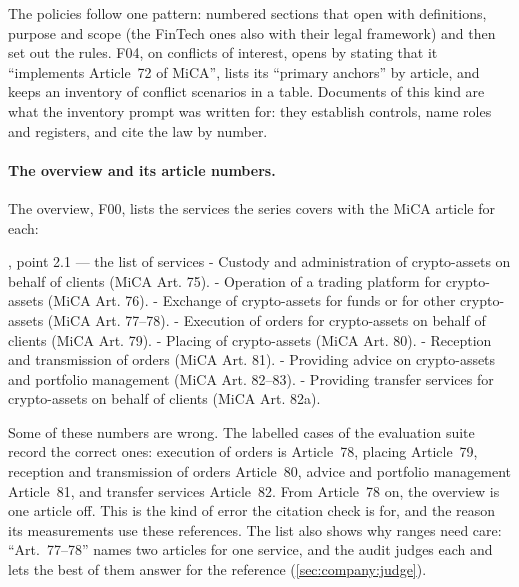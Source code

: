 The policies follow one pattern: numbered sections that open with definitions, purpose and
scope (the FinTech ones also with their legal framework) and then set out the rules. F04, on conflicts of interest, opens by stating that it
\enquote{implements Article~72 of MiCA}, lists its \enquote{primary anchors} by article, and
keeps an inventory of conflict scenarios in a table. Documents of this kind are what the
inventory prompt was written for: they establish controls, name roles and registers, and
cite the law by number.

\paragraph{The overview and its article numbers.} The overview, F00, lists the services the
series covers with the MiCA article for each:

\begin{codefile}{, point 2.1 --- the list of services}
- Custody and administration of crypto-assets on behalf of clients (MiCA Art. 75).
- Operation of a trading platform for crypto-assets (MiCA Art. 76).
- Exchange of crypto-assets for funds or for other crypto-assets (MiCA Art. 77–78).
- Execution of orders for crypto-assets on behalf of clients (MiCA Art. 79).
- Placing of crypto-assets (MiCA Art. 80).
- Reception and transmission of orders (MiCA Art. 81).
- Providing advice on crypto-assets and portfolio management (MiCA Art. 82–83).
- Providing transfer services for crypto-assets on behalf of clients (MiCA Art. 82a).
\end{codefile}

Some of these numbers are wrong. The labelled cases of the evaluation suite record the
correct ones: execution of orders is Article~78, placing Article~79, reception and
transmission of orders Article~80, advice and portfolio management Article~81, and transfer
services Article~82. From Article~78 on, the overview is one article off. This is the kind of
error the citation check is for, and the reason its measurements use these references. The
list also shows why ranges need care: \enquote{Art.~77--78} names two articles for one
service, and the audit judges each and lets the best of them answer for the reference
(\cref{sec:company:judge}).

